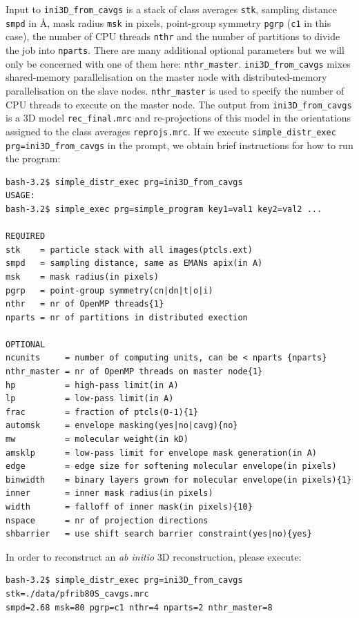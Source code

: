 \documentclass[a4paper,11pt]{article}
\newcommand{\prgname}[1]{\textcolor{NavyBlue}{\texttt{#1}}}
\begin{document}
Input to \prgname{ini3D\_from\_cavgs} is a stack of class averages \texttt{stk}, sampling distance \texttt{smpd} in \AA{}, mask radius \texttt{msk} in pixels, point-group symmetry \texttt{pgrp} (\texttt{c1} in this case), the number of CPU threads \texttt{nthr} and the number of partitions to divide the job into \texttt{nparts}. There are many additional optional parameters but we will only be concerned with one of them here: \texttt{nthr\_master}. \prgname{ini3D\_from\_cavgs} mixes shared-memory parallelisation on the master node with distributed-memory parallelisation on the slave nodes. \texttt{nthr\_master} is used to specify the number of CPU threads to execute on the master node. The output from \prgname{ini3D\_from\_cavgs} is a 3D model \texttt{rec\_final.mrc} and re-projections of this model in the orientations assigned to the class averages \texttt{reprojs.mrc}. If we execute \texttt{simple\_distr\_exec prg=ini3D\_from\_cavgs} in the prompt, we obtain brief instructions for how to run the program:
\begin{verbatim}
bash-3.2$ simple_distr_exec prg=ini3D_from_cavgs
USAGE:
bash-3.2$ simple_exec prg=simple_program key1=val1 key2=val2 ...

REQUIRED
stk    = particle stack with all images(ptcls.ext)
smpd   = sampling distance, same as EMANs apix(in A)
msk    = mask radius(in pixels)
pgrp   = point-group symmetry(cn|dn|t|o|i)
nthr   = nr of OpenMP threads{1}
nparts = nr of partitions in distributed exection

OPTIONAL
ncunits     = number of computing units, can be < nparts {nparts}
nthr_master = nr of OpenMP threads on master node{1}
hp          = high-pass limit(in A)
lp          = low-pass limit(in A)
frac        = fraction of ptcls(0-1){1}
automsk     = envelope masking(yes|no|cavg){no}
mw          = molecular weight(in kD)
amsklp      = low-pass limit for envelope mask generation(in A)
edge        = edge size for softening molecular envelope(in pixels)
binwidth    = binary layers grown for molecular envelope(in pixels){1}
inner       = inner mask radius(in pixels)
width       = falloff of inner mask(in pixels){10}
nspace      = nr of projection directions
shbarrier   = use shift search barrier constraint(yes|no){yes}
\end{verbatim}
In order to reconstruct an \textit{ab initio} 3D reconstruction, please execute:
\begin{verbatim}
bash-3.2$ simple_distr_exec prg=ini3D_from_cavgs stk=./data/pfrib80S_cavgs.mrc
smpd=2.68 msk=80 pgrp=c1 nthr=4 nparts=2 nthr_master=8
\end{verbatim}
\end{document}
